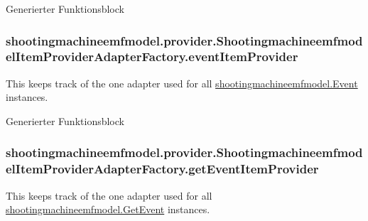 Generierter Funktionsblock \hypertarget{classshootingmachineemfmodel_1_1provider_1_1_shootingmachineemfmodel_item_provider_adapter_factory_ad5408b5a39d6585dfe277b101fcf41ab}{
\subsubsection[{event\-Item\-Provider}]{ shootingmachineemfmodel.\-provider.\-Shootingmachineemfmodel\-Item\-Provider\-Adapter\-Factory.\-event\-Item\-Provider\hspace{0.3cm}{\ttfamily [protected]}}}\label{classshootingmachineemfmodel_1_1provider_1_1_shootingmachineemfmodel_item_provider_adapter_factory_ad5408b5a39d6585dfe277b101fcf41ab}
This keeps track of the one adapter used for all \hyperlink{interfaceshootingmachineemfmodel_1_1_event}{shootingmachineemfmodel.\-Event} instances.

Generierter Funktionsblock \hypertarget{classshootingmachineemfmodel_1_1provider_1_1_shootingmachineemfmodel_item_provider_adapter_factory_af2728621ead83dff85b3d646cc076ca8}{
\subsubsection[{get\-Event\-Item\-Provider}]{ shootingmachineemfmodel.\-provider.\-Shootingmachineemfmodel\-Item\-Provider\-Adapter\-Factory.\-get\-Event\-Item\-Provider\hspace{0.3cm}{\ttfamily [protected]}}}\label{classshootingmachineemfmodel_1_1provider_1_1_shootingmachineemfmodel_item_provider_adapter_factory_af2728621ead83dff85b3d646cc076ca8}
This keeps track of the one adapter used for all \hyperlink{interfaceshootingmachineemfmodel_1_1_get_event}{shootingmachineemfmodel.\-Get\-Event} instances.

